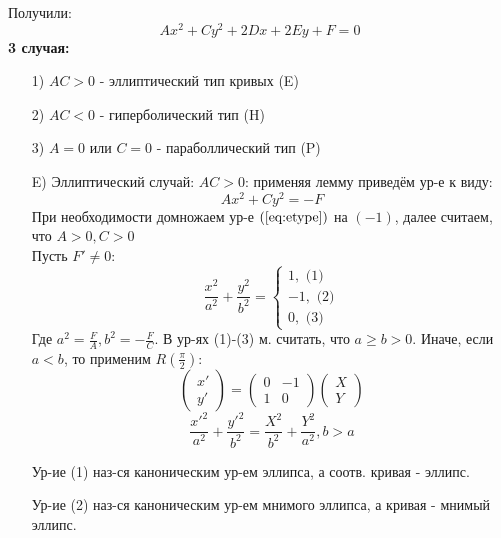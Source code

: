 Получили:
\begin{equation}
Ax^{2} + Cy^{2} + 2Dx + 2Ey + F = 0
\end{equation}
\textbf{3 случая:}
\begin{itemize}
  \item [1) ] $AC > 0$ - эллиптический тип кривых (E)
  \item [2) ] $AC < 0$ - гиперболический тип (H)
  \item [3) ] $A = 0$ или $C = 0$ - параболлический тип (P)
\end{itemize}
\begin{itemize}
  \item [E) ] Эллиптический случай: $AC > 0$: применяя лемму приведём ур-е к виду:
    \begin{equation}
      \label{eq:etype}
    Ax^{2} + Cy^{2} = -F
    \end{equation}
    При необходимости домножаем ур-е $(\ref{eq:etype})$ на $(-1)$, далее считаем, что $A > 0, C > 0$ \\
    Пусть $F' \neq 0$:
    \[
      \frac{x^{2}}{a^{2}} + \frac{y^{2}}{b^{2}} = \begin{cases}
      1, \text{ (1)} \\
      -1, \text{ (2)}\\
      0, \text{ (3)}
      \end{cases}
    \]
    Где $a^{2} = \frac{F}{A}, b^{2} = -\frac{F}{C}$. В ур-ях (1)-(3) м. считать, что $a \geq b > 0$. Иначе, если $a < b$, то применим $R(\frac{\pi}{2})$:
    \[
      \begin{pmatrix}x' \\ y' \end{pmatrix} = \begin{pmatrix} 0 & -1 \\ 1 & 0 \end{pmatrix} \begin{pmatrix}X \\ Y \end{pmatrix}
    \]
    \[
      \frac{x'^{2}}{a^{2}} + \frac{y'^{2}}{b^{2}} = \frac{X^{2}}{b^{2}} + \frac{Y^{2}}{a^{2}}, b > a
    \]
    \begin{definition}
    Ур-ие (1) наз-ся каноническим ур-ем эллипса, а соотв. кривая - эллипс.
    \end{definition}
    \begin{definition}
    Ур-ие (2) наз-ся каноническим ур-ем мнимого эллипса, а кривая - мнимый эллипс.
    \end{definition}
    \begin{definition}

\end{definition}
\end{itemize}
